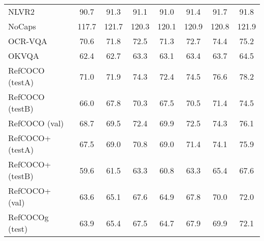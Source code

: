\begin{tabular}{lccccccc}
NLVR2 & \phantom{-}\phantom{0}90.7 & \phantom{-}\phantom{0}91.3 & \phantom{-}\phantom{0}91.1 & \phantom{-}\phantom{0}91.0 & \phantom{-}\phantom{0}91.4 & \phantom{-}\phantom{0}91.7 & \phantom{-}\phantom{0}91.8 \\
NoCaps & \phantom{-}117.7 & \phantom{-}121.7 & \phantom{-}120.3 & \phantom{-}120.1 & \phantom{-}120.9 & \phantom{-}120.8 & \phantom{-}121.9 \\
OCR-VQA & \phantom{-}\phantom{0}70.6 & \phantom{-}\phantom{0}71.8 & \phantom{-}\phantom{0}72.5 & \phantom{-}\phantom{0}71.3 & \phantom{-}\phantom{0}72.7 & \phantom{-}\phantom{0}74.4 & \phantom{-}\phantom{0}75.2 \\
OKVQA & \phantom{-}\phantom{0}62.4 & \phantom{-}\phantom{0}62.7 & \phantom{-}\phantom{0}63.3 & \phantom{-}\phantom{0}63.1 & \phantom{-}\phantom{0}63.4 & \phantom{-}\phantom{0}63.7 & \phantom{-}\phantom{0}64.5 \\
RefCOCO (testA) & \phantom{-}\phantom{0}71.0 & \phantom{-}\phantom{0}71.9 & \phantom{-}\phantom{0}74.3 & \phantom{-}\phantom{0}72.4 & \phantom{-}\phantom{0}74.5 & \phantom{-}\phantom{0}76.6 & \phantom{-}\phantom{0}78.2 \\
RefCOCO (testB) & \phantom{-}\phantom{0}66.0 & \phantom{-}\phantom{0}67.8 & \phantom{-}\phantom{0}70.3 & \phantom{-}\phantom{0}67.5 & \phantom{-}\phantom{0}70.5 & \phantom{-}\phantom{0}71.4 & \phantom{-}\phantom{0}74.5 \\
RefCOCO (val) & \phantom{-}\phantom{0}68.7 & \phantom{-}\phantom{0}69.5 & \phantom{-}\phantom{0}72.4 & \phantom{-}\phantom{0}69.9 & \phantom{-}\phantom{0}72.5 & \phantom{-}\phantom{0}74.3 & \phantom{-}\phantom{0}76.1 \\
RefCOCO+ (testA) & \phantom{-}\phantom{0}67.5 & \phantom{-}\phantom{0}69.0 & \phantom{-}\phantom{0}70.8 & \phantom{-}\phantom{0}69.0 & \phantom{-}\phantom{0}71.4 & \phantom{-}\phantom{0}74.1 & \phantom{-}\phantom{0}75.9 \\
RefCOCO+ (testB) & \phantom{-}\phantom{0}59.6 & \phantom{-}\phantom{0}61.5 & \phantom{-}\phantom{0}63.3 & \phantom{-}\phantom{0}60.8 & \phantom{-}\phantom{0}63.3 & \phantom{-}\phantom{0}65.4 & \phantom{-}\phantom{0}67.6 \\
RefCOCO+ (val) & \phantom{-}\phantom{0}63.6 & \phantom{-}\phantom{0}65.1 & \phantom{-}\phantom{0}67.6 & \phantom{-}\phantom{0}64.9 & \phantom{-}\phantom{0}67.8 & \phantom{-}\phantom{0}70.0 & \phantom{-}\phantom{0}72.0 \\
RefCOCOg (test) & \phantom{-}\phantom{0}63.9 & \phantom{-}\phantom{0}65.4 & \phantom{-}\phantom{0}67.5 & \phantom{-}\phantom{0}64.7 & \phantom{-}\phantom{0}67.9 & \phantom{-}\phantom{0}69.9 & \phantom{-}\phantom{0}72.1 \\

\end{tabular}
